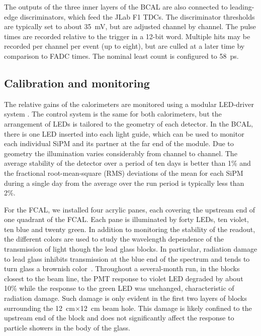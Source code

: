 The outputs of the three inner layers of the BCAL are also connected to leading-edge discriminators, which feed the JLab F1 TDCs. The discriminator thresholds are typically set to about 35~mV, but are adjusted
 channel by channel.  The pulse times are recorded relative to the trigger in a 12-bit word. Multiple hits may be recorded per channel per event (up to eight), but are culled at a later time by comparison to FADC times. The nominal least count is configured to 58~ps.


\subsection[Calibration and monitoring]{Calibration and monitoring \label{sec:calcalib}}
The relative gains of the calorimeters are monitored using a modular LED-driver system \cite{Anassontzis201441}. The control system is the same for both calorimeters, but the arrangement of LEDs is tailored to the geometry of each detector. In the BCAL, there is one LED inserted into each light guide, which can be used to monitor each individual SiPM and its partner at the far end of the module.
Due to geometry the illumination varies considerably from channel to channel. 
The average stability of the detector over a period of ten days is better than 1\% and the fractional root-mean-square (RMS) deviations of the mean for each SiPM during a single day from the average over the run period is typically less than 2\%.

For the FCAL, we installed four acrylic panes, each covering the upstream end of one quadrant of the FCAL. Each pane is illuminated by forty LEDs, ten violet, ten blue and twenty green. In addition to monitoring the stability of the readout, the different colors are used to study the wavelength dependence of the transmission of light though the lead glass blocks.  In particular, radiation damage to lead glass inhibits transmission at the blue end of the spectrum and tends to turn glass a brownish color~\cite{Schaefer:2011gw}.  Throughout a several-month run, in the blocks closest to the beam line, the PMT response to violet LED degraded by about 10\% while the response to the green LED was unchanged, characteristic of radiation damage.  Such damage is only evident in the first two layers of blocks surrounding the 12~cm$\times$12~cm beam hole. This damage is likely confined to the upstream end of the block and does not significantly affect the response to particle showers in the body of the glass.

